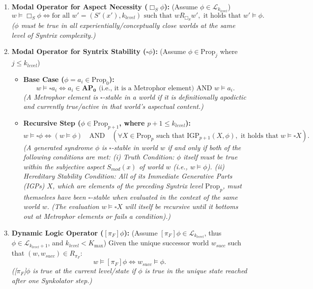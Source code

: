 \documentclass[
    12pt,              %
    a4paper,           %
    headings=normal,   %
    twoside=true,      %
    BCOR=8mm,          %
]{scrbook}
\newcommand{\BoxS}{\Box_S}
\newcommand{\BoxSyn}{\square}
\newcommand{\dynboxgen}[1]{[#1]}
\newcommand{\Kmax}{K_{\text{max}}}
\newcommand{\APZero}{\mathbf{AP_0}}
\newcommand{\Propk}[1]{\text{Prop}_{#1}}
\newcommand{\IGPk}[1]{\text{IGP}_{#1}}
\begin{document}
\begin{enumerate}[label=\arabic*.]
    \item  \textbf{Modal Operator for Aspect Necessity (\(\BoxS \phi\)):}
        (Assume \(\phi \in \mathcal{L}_{k_{level}}\))
        \[w \vDash \BoxS \phi \iff \text{for all } w' = (S'(x'), k_{level}) \text{ such that } wR_{\BoxS}w', \text{ it holds that } w' \vDash \phi.\]
        \textit{(\(\phi\) must be true in all experientially/conceptually close worlds at the same level of Syntrix complexity.)}

    \item  \textbf{Modal Operator for Syntrix Stability (\(\BoxSyn \phi\)):}
        (Assume \(\phi \in \Propk{j}\) where \(j \le k_{level}\))
        \begin{itemize}
            \item   \textbf{Base Case (\(\phi = a_i \in \Propk{0}\)):}
                \[w \vDash \BoxSyn a_i \iff a_i \in \APZero \text{ (i.e., it is a Metrophor element) AND } w \vDash a_i.\]
                \textit{(A Metrophor element is \(\BoxSyn\)-stable in a world if it is definitionally apodictic and currently true/active in that world's aspectual content.)}
            \item   \textbf{Recursive Step (\(\phi \in \Propk{p+1}\), where \(p + 1 \le k_{level}\)):}
                \[w \vDash \BoxSyn \phi \iff (w \vDash \phi) \quad \text{AND} \quad (\forall X \in \Propk{p} \text{ such that } \IGPk{p+1}(X, \phi), \text{ it holds that } w \vDash \BoxSyn X).\]
                \textit{(A generated syndrome \(\phi\) is \(\BoxSyn\)-stable in world \(w\) if and only if both of the following conditions are met: (i) Truth Condition: \(\phi\) itself must be true within the subjective aspect \(S_{mod}(x)\) of world \(w\) (i.e., \(w \vDash \phi\)). (ii) Hereditary Stability Condition: All of its Immediate Generative Parts (IGPs) \(X\), which are elements of the preceding Syntrix level \(\Propk{p}\), must themselves have been \(\BoxSyn\)-stable when evaluated in the context of the same world \(w\). (The evaluation \(w \vDash \BoxSyn X\) will itself be recursive until it bottoms out at Metrophor elements or fails a condition).)}
        \end{itemize}

    \item  \textbf{Dynamic Logic Operator (\(\dynboxgen{\pi_F}\phi\)):}
        (Assume \(\dynboxgen{\pi_F}\phi \in \mathcal{L}_{k_{level}}\), thus \(\phi \in \mathcal{L}_{k_{level}+1}\), and \(k_{level} < \Kmax\))
        Given the unique successor world \(w_{succ}\) such that \((w, w_{succ}) \in R_{\pi_F}\):
        \[w \vDash \dynboxgen{\pi_F}\phi \iff w_{succ} \vDash \phi.\]
        \textit{([\(\pi_F\)]\(\phi\) is true at the current level/state if \(\phi\) is true in the unique state reached after one Synkolator step.)}


\end{enumerate}
\end{document}
